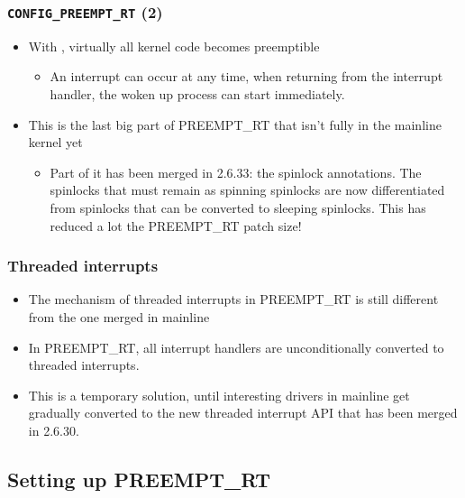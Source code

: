 \begin{frame}
  \frametitle{{\tt CONFIG\_PREEMPT\_RT} (2)}
  \begin{itemize}
  \item With , virtually all kernel code
    becomes preemptible
    \begin{itemize}
    \item An interrupt can occur at any time, when returning from the
      interrupt handler, the woken up process can start immediately.
    \end{itemize}
  \item This is the last big part of PREEMPT\_RT that isn't fully in
    the mainline kernel yet
    \begin{itemize}
    \item Part of it has been merged in 2.6.33: the spinlock
      annotations. The spinlocks that must remain as spinning
      spinlocks are now differentiated from spinlocks that can be
      converted to sleeping spinlocks. This has reduced a lot the
      PREEMPT\_RT patch size!
    \end{itemize}
  \end{itemize}
\end{frame}

\begin{frame}
  \frametitle{Threaded interrupts}
  \begin{itemize}
  \item The mechanism of threaded interrupts in PREEMPT\_RT is still
    different from the one merged in mainline
  \item In PREEMPT\_RT, all interrupt handlers are unconditionally
    converted to threaded interrupts.
  \item This is a temporary solution, until interesting drivers in
    mainline get gradually converted to the new threaded interrupt API
    that has been merged in 2.6.30.
  \end{itemize}
\end{frame}

\subsection{Setting up PREEMPT\_RT}

